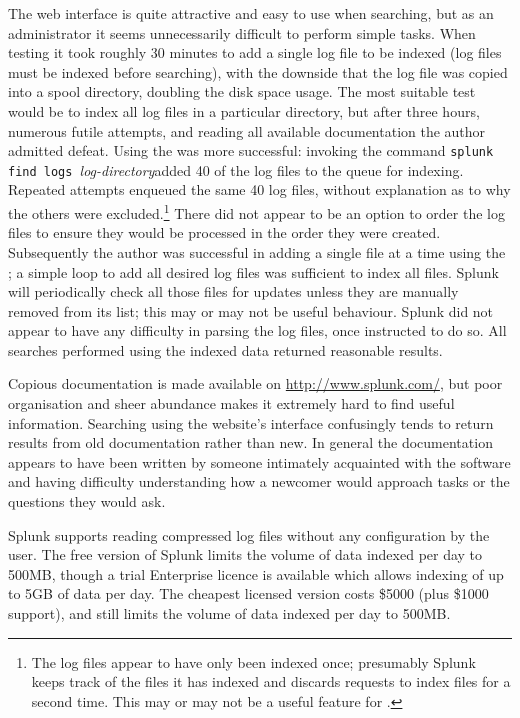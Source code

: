 The web interface is quite attractive and easy to use when searching, but
as an administrator it seems unnecessarily difficult to perform simple
tasks.  When testing it took roughly 30 minutes to add a single log file to
be indexed (log files must be indexed before searching), with the downside
that the log file was copied into a spool directory, doubling the disk
space usage.  The most suitable test would be to index all log files in a
particular directory, but after three hours, numerous futile attempts, and
reading all available documentation the author admitted defeat.  Using the
\CLI{} was more successful: invoking the command \newline \tab{}
\texttt{splunk find logs }\textit{log-directory\/}\newline added 40 of the
\numberOFlogFILES{} log files to the queue for indexing.  Repeated attempts
enqueued the same 40 log files, without explanation as to why the others
were excluded.\footnote{The log files appear to have only been indexed
once; presumably Splunk keeps track of the files it has indexed and
discards requests to index files for a second time.  This may or may not be
a useful feature for \parsername{}.} There did not appear to be an option
to order the log files to ensure they would be processed in the order they
were created.  Subsequently the author was successful in adding a single
file at a time using the \CLI{}; a simple loop to add all desired log files
was sufficient to index all files.  Splunk will periodically check all
those files for updates unless they are manually removed from its list;
this may or may not be useful behaviour.  Splunk did not appear to have any
difficulty in parsing the log files, once instructed to do so.  All
searches performed using the indexed data returned reasonable results.

Copious documentation is made available on \url{http://www.splunk.com/},
but poor organisation and sheer abundance makes it extremely hard to find
useful information.  Searching using the website's interface confusingly
tends to return results from old documentation rather than new.  In
general the documentation appears to have been written by someone
intimately acquainted with the software and having difficulty understanding
how a newcomer would approach tasks or the questions they would ask.

Splunk supports reading compressed log files without any configuration by
the user.  The free version of Splunk limits the volume of data indexed per
day to 500MB, though a trial Enterprise licence is available which allows
indexing of up to 5GB of data per day.  The cheapest licensed version costs
\$5000 (plus \$1000 support), and still limits the volume of data indexed
per day to 500MB\@.

